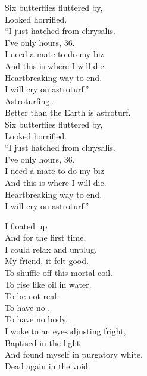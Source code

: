 Six butterflies fluttered by, \\
Looked horrified. \\
``I just hatched from chrysalis. \\
I've only hours, 36. \\
I need a mate to do my biz \\
And this is where I will die. \\
Heartbreaking way to end. \\
I will cry on astroturf.'' \\

Astroturfing… \\

Better than the Earth is astroturf. \\

Six butterflies fluttered by, \\
Looked horrified. \\
``I just hatched from chrysalis. \\
I've only hours, 36. \\
I need a mate to do my biz \\
And this is where I will die. \\
Heartbreaking way to end. \\
I will cry on astroturf.'' \\





I floated up \\
And for the first time, \\
I could relax and unplug. \\
My friend, it felt good. \\

To shuffle off this mortal coil. \\
To rise like oil in water. \\
To be not real. \\
To have no . \\
To have no body. \\

I woke to an eye-adjusting fright, \\
Baptised in the light \\
And found myself in purgatory white. \\
Dead again in the void. \\

